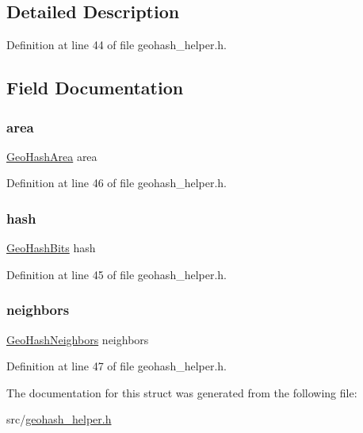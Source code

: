 \subsection{Detailed Description}


Definition at line 44 of file geohash\+\_\+helper.\+h.



\subsection{Field Documentation}
\mbox{\label{struct_geo_hash_radius_ab8ed53e3d15a3c96c0b699110d1b3d69}} 
\subsubsection{\texorpdfstring{area}{area}}
{\footnotesize\ttfamily \hyperlink{struct_geo_hash_area}{Geo\+Hash\+Area} area}



Definition at line 46 of file geohash\+\_\+helper.\+h.

\mbox{\label{struct_geo_hash_radius_aaa5dc202256f654179069f62d2d44cf6}} 
\subsubsection{\texorpdfstring{hash}{hash}}
{\footnotesize\ttfamily \hyperlink{struct_geo_hash_bits}{Geo\+Hash\+Bits} hash}



Definition at line 45 of file geohash\+\_\+helper.\+h.

\mbox{\label{struct_geo_hash_radius_a2294fb3cd98344a75f1e5960818f2a31}} 
\subsubsection{\texorpdfstring{neighbors}{neighbors}}
{\footnotesize\ttfamily \hyperlink{struct_geo_hash_neighbors}{Geo\+Hash\+Neighbors} neighbors}



Definition at line 47 of file geohash\+\_\+helper.\+h.



The documentation for this struct was generated from the following file\+:\begin{DoxyCompactItemize}
\item 
src/\hyperlink{geohash__helper_8h}{geohash\+\_\+helper.\+h}\end{DoxyCompactItemize}
